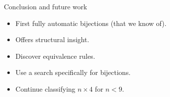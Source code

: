 \begin{frame}{Conclusion and future work}
    \begin{itemize}
        \item First fully automatic bijections (that we know of).
        \item Offers structural insight.
        \item Discover equivalence rules.
        \item Use a search specifically for bijections.
        \item Continue classifying $n \times 4$ for $n < 9$.
    \end{itemize}
\end{frame}